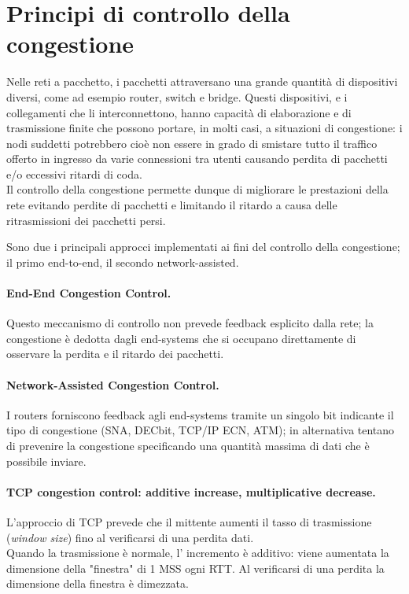 \section{Principi di controllo della congestione}
Nelle reti a pacchetto, i pacchetti attraversano una grande quantità di dispositivi diversi, come ad esempio router, switch e bridge. Questi dispositivi, e i collegamenti che li interconnettono, hanno capacità di elaborazione e di trasmissione finite che possono portare, in molti casi, a situazioni di congestione: i nodi suddetti potrebbero cioè non essere in grado di smistare tutto il traffico offerto in ingresso da varie connessioni tra utenti causando perdita di pacchetti e/o eccessivi ritardi di coda.\\
Il controllo della congestione permette dunque di migliorare le prestazioni della rete evitando perdite di pacchetti e limitando il ritardo a causa delle ritrasmissioni dei pacchetti persi.

Sono due i principali approcci implementati ai fini del controllo della congestione; il primo end-to-end, il secondo network-assisted.

\paragraph{End-End Congestion Control.}
Questo meccanismo di controllo non prevede feedback esplicito dalla rete; la congestione è dedotta dagli end-systems che si occupano direttamente di osservare la perdita e il ritardo dei pacchetti.
\paragraph{Network-Assisted Congestion Control.} I routers forniscono feedback agli end-systems tramite un singolo bit indicante il tipo di congestione %
(SNA, DECbit, TCP/IP ECN, ATM); in alternativa tentano di prevenire la congestione specificando una quantità massima di dati che è possibile inviare.\\

\paragraph{TCP congestion control: additive increase, multiplicative decrease.}
L'approccio di TCP prevede che il mittente aumenti il tasso di trasmissione (\textit{window size}) fino al verificarsi di una perdita dati.\\
Quando la trasmissione è normale, l' incremento è additivo: viene aumentata la dimensione della "finestra" di 1 MSS ogni RTT.
Al verificarsi di una perdita la dimensione della finestra è dimezzata.


